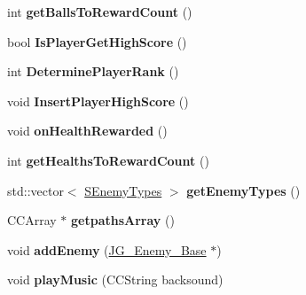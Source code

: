 \begin{DoxyCompactItemize}
\item 
\hypertarget{class_j_g___game___main_af4127dc6ecb9f8b465b975be8bdc9a8a}{int {\bfseries get\-Balls\-To\-Reward\-Count} ()}\label{class_j_g___game___main_af4127dc6ecb9f8b465b975be8bdc9a8a}

\item 
\hypertarget{class_j_g___game___main_ac4010559c73152e4dcd42176b2b8b00c}{bool {\bfseries Is\-Player\-Get\-High\-Score} ()}\label{class_j_g___game___main_ac4010559c73152e4dcd42176b2b8b00c}

\item 
\hypertarget{class_j_g___game___main_aa1d4b5bfecb0c33a98ccb9c36026863e}{int {\bfseries Determine\-Player\-Rank} ()}\label{class_j_g___game___main_aa1d4b5bfecb0c33a98ccb9c36026863e}

\item 
\hypertarget{class_j_g___game___main_a82d8d93c069b1d3716e396faa65c8ca0}{void {\bfseries Insert\-Player\-High\-Score} ()}\label{class_j_g___game___main_a82d8d93c069b1d3716e396faa65c8ca0}

\item 
\hypertarget{class_j_g___game___main_a1f21c075f43477a87f529fee91a9159e}{void {\bfseries on\-Health\-Rewarded} ()}\label{class_j_g___game___main_a1f21c075f43477a87f529fee91a9159e}

\item 
\hypertarget{class_j_g___game___main_ac2a23c0fc00b5062ce70fad7f76ea7be}{int {\bfseries get\-Healths\-To\-Reward\-Count} ()}\label{class_j_g___game___main_ac2a23c0fc00b5062ce70fad7f76ea7be}

\item 
\hypertarget{class_j_g___game___main_a15160d941c207cfc71ade62d5a10698f}{std\-::vector$<$ \hyperlink{struct_s_enemy_types}{S\-Enemy\-Types} $>$ {\bfseries get\-Enemy\-Types} ()}\label{class_j_g___game___main_a15160d941c207cfc71ade62d5a10698f}

\item 
\hypertarget{class_j_g___game___main_af80fdebf8455aa63765c052d59ff0a13}{C\-C\-Array $\ast$ {\bfseries getpaths\-Array} ()}\label{class_j_g___game___main_af80fdebf8455aa63765c052d59ff0a13}

\item 
\hypertarget{class_j_g___game___main_ac73f4e5031b391acb54215c4d672a92d}{void {\bfseries add\-Enemy} (\hyperlink{class_j_g___enemy___base}{J\-G\-\_\-\-Enemy\-\_\-\-Base} $\ast$)}\label{class_j_g___game___main_ac73f4e5031b391acb54215c4d672a92d}

\item 
\hypertarget{class_j_g___game___main_aaf6a983dd4b3a9ca32bf53d4317ea6aa}{void {\bfseries play\-Music} (C\-C\-String backsound)}\label{class_j_g___game___main_aaf6a983dd4b3a9ca32bf53d4317ea6aa}


\end{DoxyCompactItemize}
